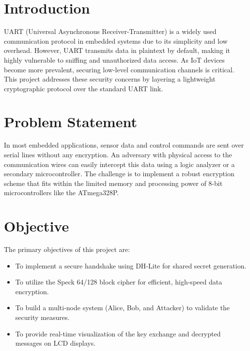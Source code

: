 \documentclass[12pt,a4paper]{article}
\begin{document}
\section{Introduction}
UART (Universal Asynchronous Receiver-Transmitter) is a widely used communication protocol in embedded systems due to its simplicity and low overhead. However, UART transmits data in plaintext by default, making it highly vulnerable to sniffing and unauthorized data access. As IoT devices become more prevalent, securing low-level communication channels is critical. This project addresses these security concerns by layering a lightweight cryptographic protocol over the standard UART link.

\section{Problem Statement}
In most embedded applications, sensor data and control commands are sent over serial lines without any encryption. An adversary with physical access to the communication wires can easily intercept this data using a logic analyzer or a secondary microcontroller. The challenge is to implement a robust encryption scheme that fits within the limited memory and processing power of 8-bit microcontrollers like the ATmega328P.

\section{Objective}
The primary objectives of this project are:
\begin{itemize}
    \item To implement a secure handshake using DH-Lite for shared secret generation.
    \item To utilize the Speck 64/128 block cipher for efficient, high-speed data encryption.
    \item To build a multi-node system (Alice, Bob, and Attacker) to validate the security measures.
    \item To provide real-time visualization of the key exchange and decrypted messages on LCD displays.
\end{itemize}
\end{document}
